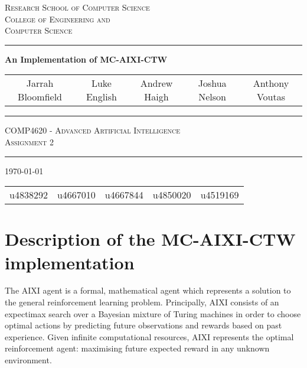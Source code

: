 \documentclass[pdftex,twoside,a4paper]{report}
\begin{document}
\begin{titlepage}
\renewcommand*{\thefootnote}{\fnsymbol{footnote}}
\begin{center}

\textsc{\Large Research School of Computer Science}\\[0.5cm]
\textsc{\Large College of Engineering and}\\[0.2cm]
\textsc{\Large Computer Science}\\[0.5cm]
\vspace{1.4cm}
\hrule
\vspace{1.4cm}
{\huge \bfseries An Implementation of MC-AIXI-CTW} \\
\vspace{0.4cm}


\begin{tabular}{ccccc}
  Jarrah Bloomfield\footnotemark &
  Luke English\footnotemark &
  Andrew Haigh\footnotemark &
  Joshua Nelson\footnotemark &
  Anthony Voutas\footnotemark
\end{tabular}

\vspace{1.4cm}
\hrule
\vspace{1.0cm}
\textsc{\large COMP4620 - Advanced Artificial Intelligence}\\
\textsc{Assignment 2}\\
\vspace{1.0cm}
\hrule
\vspace{1.4cm}
\vfill
{\large \today} \\[0.5cm]

\begin{tabular}{ccccc}
  \setcounter{footnote}{0}
  u4838292\footnotemark &
  u4667010\footnotemark &
  u4667844\footnotemark &
  u4850020\footnotemark &
  u4519169\footnotemark
\end{tabular}
\end{center}
 
\end{titlepage}
\chapter{Description of the MC-AIXI-CTW implementation}

The AIXI agent is a formal, mathematical agent which represents a solution to
the general reinforcement learning problem. Principally, AIXI consists of an
expectimax search over a Bayesian mixture of Turing machines in order to
choose optimal actions by predicting future observations and rewards based on
past experience. Given infinite computational resources, AIXI represents the
optimal reinforcement agent: maximising future expected reward in any unknown
environment.
\end{document}
